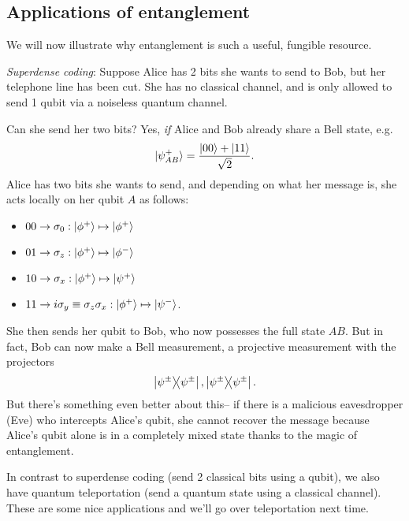 \subsection*{Applications of entanglement}

We will now illustrate why entanglement is such a useful, fungible resource.

\textit{Superdense coding}: Suppose Alice has 2 bits she wants to send to Bob, but her telephone line has been cut. She has no classical channel, and is only allowed to send 1 qubit via a noiseless quantum channel.

Can she send her two bits? Yes, \emph{if} Alice and Bob already share a Bell state, e.g. 
\begin{equation}
    \lvert\psi_{AB}^+\rangle =\frac{\lvert00\rangle+\lvert11\rangle}{\sqrt{2}}.
\end{equation}
Alice has two bits she wants to send, and depending on what her message is, she acts locally on her qubit $A$ as follows:
\begin{itemize}
    \item $00\to \sigma_0:\lvert\phi^+\rangle\mapsto \lvert\phi^+\rangle$
    \item $01 \to \sigma_z:\lvert\phi^+\rangle\mapsto \lvert\phi^-\rangle$
    \item $10 \to \sigma_x:\lvert\phi^+\rangle\mapsto \lvert\psi^+\rangle$
    \item $11\to i\sigma_y \equiv \sigma_z\sigma_x:\lvert\phi^+\rangle\mapsto \lvert\psi^-\rangle$.
\end{itemize}
She then sends her qubit to Bob, who now possesses the full state $AB$. But in fact, Bob can now make a Bell measurement, a projective measurement with the projectors
\begin{equation}
    \left\lvert{\psi^\pm}\middle\rangle\!\middle\langle{\psi^\pm}\right\rvert,\left\lvert{\psi^\pm}\middle\rangle\!\middle\langle{\psi^\pm}\right\rvert.
\end{equation}
But there's something even better about this-- if there is a malicious eavesdropper (Eve) who intercepts Alice's qubit, she cannot recover the message because Alice's qubit alone is in a completely mixed state thanks to the magic of entanglement.

In contrast to superdense coding (send 2 classical bits using a qubit), we also have quantum teleportation (send a quantum state using a classical channel). These are some nice applications and we'll go over teleportation next time.